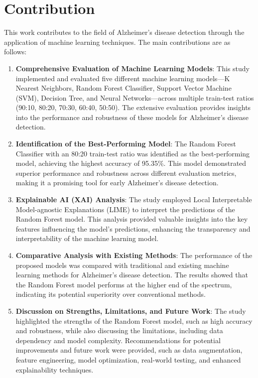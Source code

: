 \documentclass[a4paper,12pt]{report}
\begin{document}
    \section{Contribution}

This work contributes to the field of Alzheimer's disease detection through the application of machine learning techniques. The main contributions are as follows:

\begin{enumerate}
    \item \textbf{Comprehensive Evaluation of Machine Learning Models}: This study implemented and evaluated five different machine learning models—K Nearest Neighbors, Random Forest Classifier, Support Vector Machine (SVM), Decision Tree, and Neural Networks—across multiple train-test ratios (90:10, 80:20, 70:30, 60:40, 50:50). The extensive evaluation provides insights into the performance and robustness of these models for Alzheimer's disease detection.

    \item \textbf{Identification of the Best-Performing Model}: The Random Forest Classifier with an 80:20 train-test ratio was identified as the best-performing model, achieving the highest accuracy of 95.35\%. This model demonstrated superior performance and robustness across different evaluation metrics, making it a promising tool for early Alzheimer's disease detection.

    \item \textbf{Explainable AI (XAI) Analysis}: The study employed Local Interpretable Model-agnostic Explanations (LIME) to interpret the predictions of the Random Forest model. This analysis provided valuable insights into the key features influencing the model's predictions, enhancing the transparency and interpretability of the machine learning model.

    \item \textbf{Comparative Analysis with Existing Methods}: The performance of the proposed models was compared with traditional and existing machine learning methods for Alzheimer's disease detection. The results showed that the Random Forest model performs at the higher end of the spectrum, indicating its potential superiority over conventional methods.

    \item \textbf{Discussion on Strengths, Limitations, and Future Work}: The study highlighted the strengths of the Random Forest model, such as high accuracy and robustness, while also discussing the limitations, including data dependency and model complexity. Recommendations for potential improvements and future work were provided, such as data augmentation, feature engineering, model optimization, real-world testing, and enhanced explainability techniques.


\end{enumerate}
\end{document}
